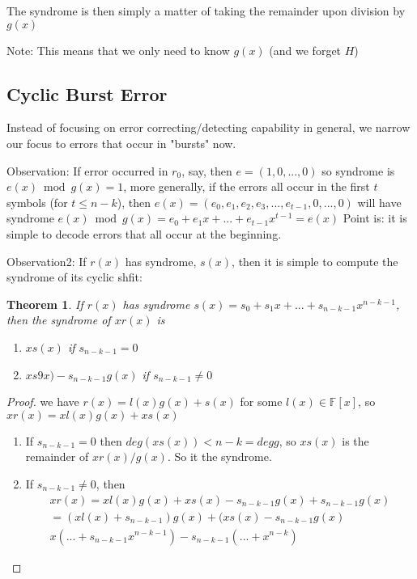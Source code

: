 \documentclass{article}
\newtheorem{thm}{Theorem}
\begin{document}
The syndrome is then simply a matter of taking the remainder upon
division by $g(x)$

Note: This means that we only need to know $g(x)$ (and we forget $H$)

\subsection{Cyclic Burst Error}
Instead of focusing on error correcting/detecting capability in general,
we narrow our focus to errors that occur in "bursts" now.

Observation: If error occurred in $r_0$, say, then $e = (1, 0, ..., 0)$
so syndrome is $e(x) \bmod{g(x)} = 1$, more generally, if the errors all
occur in the first $t$ symbols (for $t\leq n-k$), then
$e(x) = (e_0, e_1, e_2, e_3,...,e_{t-1}, 0, ..., 0)$ will have syndrome
$e(x) \bmod{g(x)} = e_0 + e_1x + ... + e_{t-1}x^{t-1} = e(x)$
Point is: it is simple to decode errors that all occur at the beginning.

Observation2: If $r(x)$ has syndrome, $s(x)$, then it is simple to
compute the syndrome of its cyclic shfit:
\begin{thm}
    If $r(x)$ has syndrome $s(x) = s_0 + s_1x + ... + s_{n-k-1}x^{n-k-1}$,
    then the syndrome of $xr(x)$ is
    \begin{enumerate}
        \item $xs(x)$ if $s_{n-k-1} = 0$
        \item $xs9x) - s_{n-k-1}g(x)$ if $s_{n-k-1} \ne 0$
    \end{enumerate}
\end{thm}

\begin{proof}
    we have $r(x) = l(x)g(x) + s(x)$ for some $l(x)\in\mathbb{F}[x]$,
    so $xr(x) = xl(x)g(x) + xs(x)$
    \begin{enumerate}
        \item If $s_{n-k-1} = 0$ then $deg(xs(x)) < n-k = deg g$, so
            $xs(x)$ is the remainder of $xr(x)/g(x)$. So it the syndrome.
        \item If $s_{n-k-1} \ne 0$, then
            \begin{align*}
                xr(x) = xl(x)g(x) + xs(x) - s_{n-k-1}g(x) +s_{n-k-1}g(x)\\
                = (xl(x) + s_{n-k-1})g(x) + (xs(x) - s_{n-k-1}g(x)\\
                x(...+s_{n-k-1}x^{n-k-1}) - s_{n-k-1}(...+x^{n-k})
            \end{align*}
    \end{enumerate}
\end{proof}
\end{document}
